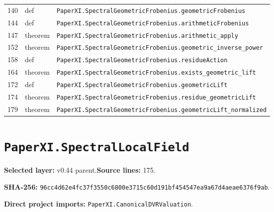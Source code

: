\documentclass[10pt,oneside]{book}
\begin{document}
\begin{longtable}{@{}p{}p{}p{}@{}}
140&def&\nolinkurl{PaperXI.SpectralGeometricFrobenius.geometricFrobenius}\\

144&def&\nolinkurl{PaperXI.SpectralGeometricFrobenius.arithmeticFrobenius}\\

147&theorem&\nolinkurl{PaperXI.SpectralGeometricFrobenius.arithmetic_apply}\\

152&theorem&\nolinkurl{PaperXI.SpectralGeometricFrobenius.geometric_inverse_power}\\

158&def&\nolinkurl{PaperXI.SpectralGeometricFrobenius.residueAction}\\

164&theorem&\nolinkurl{PaperXI.SpectralGeometricFrobenius.exists_geometric_lift}\\

172&def&\nolinkurl{PaperXI.SpectralGeometricFrobenius.geometricLift}\\

174&theorem&\nolinkurl{PaperXI.SpectralGeometricFrobenius.residue_geometricLift}\\

179&theorem&\nolinkurl{PaperXI.SpectralGeometricFrobenius.geometricLift_normalized}\\

\bottomrule\end{longtable}

\section{\texorpdfstring{\nolinkurl{PaperXI.SpectralLocalField}}{PaperXI.SpectralLocalField}}\label{module:PaperXI.SpectralLocalField}

\textbf{Selected layer:} v0.44 parent.\quad\textbf{Source lines:} 175.\par\textbf{SHA-256:} {\scriptsize\nolinkurl{96cc4d62e4fc37f3550c6800e3715c60d191bf454547ea9a67d4aeae6376f9ab}}.


\textbf{Direct project imports:} \nolinkurl{PaperXI.CanonicalDVRValuation}.
\end{document}
